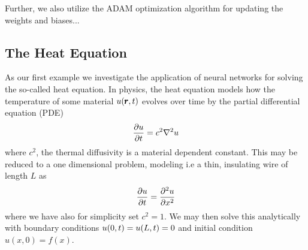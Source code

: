 \documentclass[reprint, english, nofootinbib]{revtex4-2}
\begin{document}
Further, we also utilize the ADAM optimization algorithm \cite{kingma2017adam} for updating the weights and biases...

\subsection{The Heat Equation\label{sec:Heat equation analytical}}
\noindent
As our first example we investigate the application of neural networks for solving the so-called heat equation. In physics, the heat equation models how the temperature of some material $u\qty(\pmb r, t)$ evolves over time by the partial differential equation (PDE)
\begin{equation}
    \pdv{u}{t} = c^2\nabla^2 u 
\end{equation}
where $c^2$, the thermal diffusivity is a material dependent constant. 
This may be reduced to a one dimensional problem, modeling i.e a thin, insulating wire of length $L$ as
\begin{equation}\label{eqn: 1D heat eqn}
    \pdv{u}{t} = \pdv[2]{u}{x}
\end{equation}
where we have also for simplicity set $c^2 = 1$. We may then solve this analytically with boundary conditions $u\qty(0, t) = u\qty(L,t) = 0$ and initial condition $u(x, 0) = f(x)$.
\end{document}
